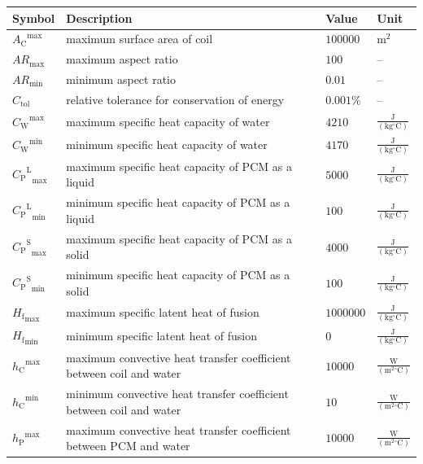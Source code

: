 \documentclass[12pt]{article}
\begin{document}
\begin{longtabu}{l X[l] l l}
\toprule
\textbf{Symbol} & \textbf{Description} & \textbf{Value} & \textbf{Unit}
\\
\midrule
\endhead
${{A_{\text{C}}}^{\text{max}}}$ & maximum surface area of coil & $100000$ & $\text{m}^{2}$
\\
${AR_{\text{max}}}$ & maximum aspect ratio & $100$ & --
\\
${AR_{\text{min}}}$ & minimum aspect ratio & $0.01$ & --
\\
${C_{\text{tol}}}$ & relative tolerance for conservation of energy & $0.001\%$ & --
\\
${{C_{\text{W}}}^{\text{max}}}$ & maximum specific heat capacity of water & $4210$ & $\frac{\text{J}}{(\text{kg}{}^{\circ}\text{C})}$
\\
${{C_{\text{W}}}^{\text{min}}}$ & minimum specific heat capacity of water & $4170$ & $\frac{\text{J}}{(\text{kg}{}^{\circ}\text{C})}$
\\
${{{C_{\text{P}}}^{\text{L}}}_{\text{max}}}$ & maximum specific heat capacity of PCM as a liquid & $5000$ & $\frac{\text{J}}{(\text{kg}{}^{\circ}\text{C})}$
\\
${{{C_{\text{P}}}^{\text{L}}}_{\text{min}}}$ & minimum specific heat capacity of PCM as a liquid & $100$ & $\frac{\text{J}}{(\text{kg}{}^{\circ}\text{C})}$
\\
${{{C_{\text{P}}}^{\text{S}}}_{\text{max}}}$ & maximum specific heat capacity of PCM as a solid & $4000$ & $\frac{\text{J}}{(\text{kg}{}^{\circ}\text{C})}$
\\
${{{C_{\text{P}}}^{\text{S}}}_{\text{min}}}$ & minimum specific heat capacity of PCM as a solid & $100$ & $\frac{\text{J}}{(\text{kg}{}^{\circ}\text{C})}$
\\
${{H_{\text{f}}}_{\text{max}}}$ & maximum specific latent heat of fusion & $1000000$ & $\frac{\text{J}}{(\text{kg}{}^{\circ}\text{C})}$
\\
${{H_{\text{f}}}_{\text{min}}}$ & minimum specific latent heat of fusion & $0$ & $\frac{\text{J}}{(\text{kg}{}^{\circ}\text{C})}$
\\
${{h_{\text{C}}}^{\text{max}}}$ & maximum convective heat transfer coefficient between coil and water & $10000$ & $\frac{\text{W}}{(\text{m}^{2}{}^{\circ}\text{C})}$
\\
${{h_{\text{C}}}^{\text{min}}}$ & minimum convective heat transfer coefficient between coil and water & $10$ & $\frac{\text{W}}{(\text{m}^{2}{}^{\circ}\text{C})}$
\\
${{h_{\text{P}}}^{\text{max}}}$ & maximum convective heat transfer coefficient between PCM and water & $10000$ & $\frac{\text{W}}{(\text{m}^{2}{}^{\circ}\text{C})}$

\end{longtabu}
\end{document}
